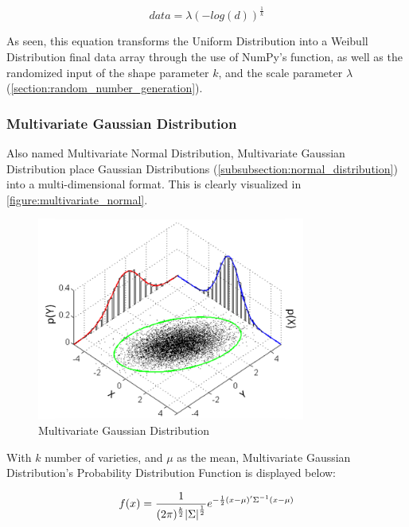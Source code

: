 \begin{displaymath}
data = \lambda(-log(d))^{\frac{1}{k}}
\end{displaymath}

\hfill

As seen, this equation transforms the Uniform Distribution into a Weibull Distribution final data array through the use of NumPy's  function, as well as the randomized input of the shape parameter \(k\), and the scale parameter \(\lambda\) (\autoref{section:random_number_generation}).


\subsubsection{Multivariate Gaussian Distribution}
Also named Multivariate Normal Distribution, Multivariate Gaussian Distribution place Gaussian Distributions (\autoref{subsubsection:normal_distribution}) into a multi-dimensional format. This is clearly visualized in \autoref{figure:multivariate_normal}.

\begin{figure}[hbt]
    \centering
    \includegraphics[width=250pt,keepaspectratio]{figures/body/methodology/multivariate_normal.png}
    \caption{Multivariate Gaussian Distribution \cite{multivariate_normal_distribution}}
    \label{figure:multivariate_normal}
\end{figure}

With \(k\) number of varieties, and \(\mu\) as the mean, Multivariate Gaussian Distribution's Probability Distribution Function is displayed below:

\begin{displaymath}
f(x) = \frac{1}{(2\pi)^{\frac{k}{2}}\abs{\Sigma}^{\frac{1}{2}}}e^{-\frac{1}{2}(x-\mu)'\Sigma^{-1}(x-\mu)}
\end{displaymath}

\hfill

